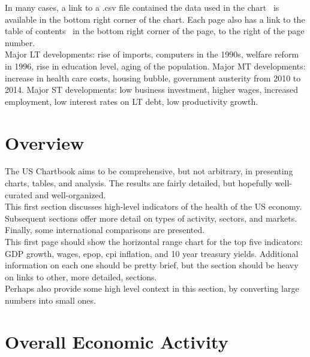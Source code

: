 \documentclass{report}
\begin{document}
\begin{minipage}{0.76\textwidth}
In many cases, a link to a .csv file contained the data used in the chart \color{blue}{\faTable}\color{black} \ is available in the bottom right corner of the chart. Each page also has a link to the table of contents \color{blue}{\faList}\color{black} \ in the bottom right corner of the page, to the right of the page number.\\

Major LT developments: rise of imports, computers in the 1990s, welfare reform in 1996, rise in education level, aging of the population. Major MT developments: increase in health care costs, housing bubble, government austerity from 2010 to 2014. Major ST developments: low business investment, higher wages, increased employment, low interest rates on LT debt, low productivity growth. 

\end{minipage}


\newpage
\section*{\color{darkgray} \LARGE  \seriffont Overview}
\label{sec:ov}
\begin{minipage}{0.76\textwidth}

\small The US Chartbook aims to be comprehensive, but not arbitrary, in presenting charts, tables, and analysis. The results are fairly detailed, but hopefully well-curated and well-organized. \\

This first section discusses high-level indicators of the health of the US economy. Subsequent sections offer more detail on types of activity, sectors, and markets. Finally, some international comparisons are presented.\\

This first page should show the horizontal range chart for the top five indicators: GDP growth, wages, epop, cpi inflation, and 10 year treasury yields. Additional information on each one should be pretty brief, but the section should be heavy on links to other, more detailed, sections.\\

Perhaps also provide some high level context in this section, by converting large numbers into small ones. 

\end{minipage}


\newpage
\section*{\color{darkgray} \LARGE  \seriffont Overall Economic Activity}
\label{sec:oea}

\end{document}

